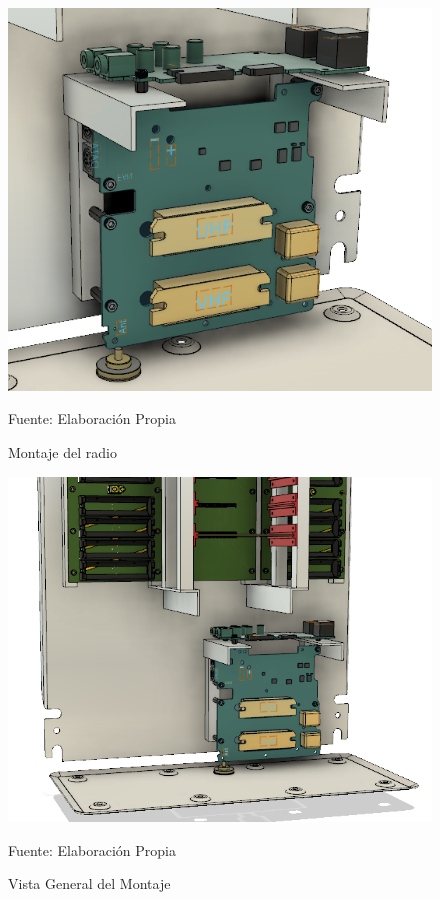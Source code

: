 \begin{figure}[H]
\centering
\includegraphics[scale=0.6]{Figuras/G3.png}
\caption{Montaje del radio}
Fuente: Elaboración Propia
\label{G3}
\end{figure}

\begin{figure}[H]
\centering
\includegraphics[scale=0.6]{Figuras/G4.png}
\caption{Vista General del Montaje}
Fuente: Elaboración Propia
\label{G4}
\end{figure}


